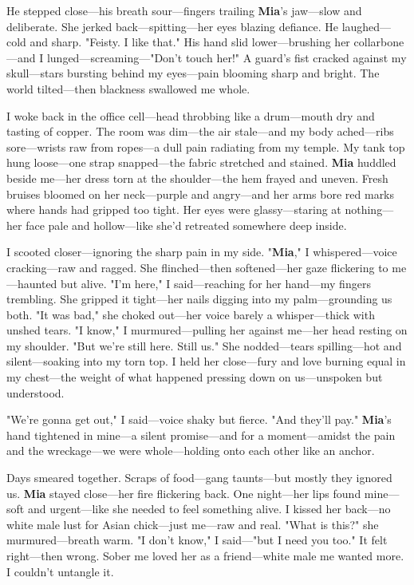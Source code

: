 \documentclass{article}
\begin{document}
He stepped close—his breath sour—fingers trailing \textbf{Mia}’s jaw—slow and deliberate. She jerked back—spitting—her eyes blazing defiance. He laughed—cold and sharp. "Feisty. I like that." His hand slid lower—brushing her collarbone—and I lunged—screaming—"Don’t touch her!" A guard’s fist cracked against my skull—stars bursting behind my eyes—pain blooming sharp and bright. The world tilted—then blackness swallowed me whole.

I woke back in the office cell—head throbbing like a drum—mouth dry and tasting of copper. The room was dim—the air stale—and my body ached—ribs sore—wrists raw from ropes—a dull pain radiating from my temple. My tank top hung loose—one strap snapped—the fabric stretched and stained. \textbf{Mia} huddled beside me—her dress torn at the shoulder—the hem frayed and uneven. Fresh bruises bloomed on her neck—purple and angry—and her arms bore red marks where hands had gripped too tight. Her eyes were glassy—staring at nothing—her face pale and hollow—like she’d retreated somewhere deep inside.

I scooted closer—ignoring the sharp pain in my side. "\textbf{Mia}," I whispered—voice cracking—raw and ragged. She flinched—then softened—her gaze flickering to me—haunted but alive. "I’m here," I said—reaching for her hand—my fingers trembling. She gripped it tight—her nails digging into my palm—grounding us both. "It was bad," she choked out—her voice barely a whisper—thick with unshed tears. "I know," I murmured—pulling her against me—her head resting on my shoulder. "But we’re still here. Still us." She nodded—tears spilling—hot and silent—soaking into my torn top. I held her close—fury and love burning equal in my chest—the weight of what happened pressing down on us—unspoken but understood.

"We’re gonna get out," I said—voice shaky but fierce. "And they’ll pay." \textbf{Mia}’s hand tightened in mine—a silent promise—and for a moment—amidst the pain and the wreckage—we were whole—holding onto each other like an anchor.

Days smeared together. Scraps of food—gang taunts—but mostly they ignored us. \textbf{Mia} stayed close—her fire flickering back. One night—her lips found mine—soft and urgent—like she needed to feel something alive. I kissed her back—no white male lust for Asian chick—just me—raw and real. "What is this?" she murmured—breath warm. "I don’t know," I said—"but I need you too." It felt right—then wrong. Sober me loved her as a friend—white male me wanted more. I couldn’t untangle it.
\end{document}
